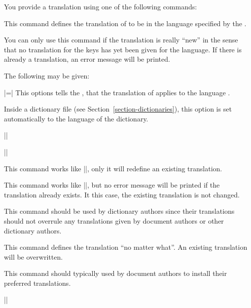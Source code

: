 You provide a translation using one of the following commands:
\begin{command}{\newtranslation{}}
  This command defines the translation of  to be  in the language specified by the .

  You can only use this command if the translation is really ``new'' in the sense that no translation for the keys has yet been given for the language. If there is already a translation, an error message will be printed.
  
  The following  may be given:
  \begin{itemize}
    |=| This options tells the \translatorname, that the translation  of  applies to the language . 
  
    Inside a dictionary file (see Section~\ref{section-dictionaries}), this option is set automatically to the language of the dictionary.
  \end{itemize}

  \example
  ||

  \example
  ||
\end{command}

\begin{command}{\renewtranslation{}}
  This command works like |\newtranslation|, only it will redefine an existing translation.
\end{command}

\begin{command}{\providetranslation{}}
  This command works like |\newtranslation|, but no error message will be printed if the translation already exists. It this case, the existing translation is not changed.

  This command should be used by dictionary authors since their translations should not overrule any translations given by document authors or other dictionary authors.
\end{command}

\begin{command}{}
  This command defines the translation ``no matter what''. An existing translation will be overwritten.

  This command should typically used by document authors to install their preferred translations.

  \example
  ||
\end{command}

